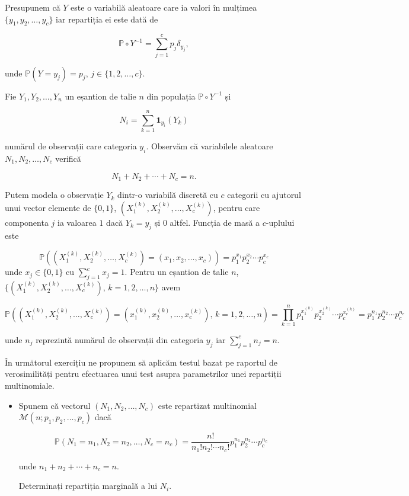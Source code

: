 \documentclass[]{article}
\newenvironment{frshaded*}{%
  \def\FrameCommand{\fboxrule=\FrameRule\fboxsep=\FrameSep \fcolorbox{framecolor}{shadecolor1}}%
  \MakeFramed {\advance\hsize-\width \FrameRestore}}%
{\endMakeFramed}
\newenvironment{rmdblock}[1]
  {\begin{frshaded*}
  \begin{itemize}
  \renewcommand{\labelitemi}{
    \raisebox{-.7\height}[0pt][0pt]{
      {\setkeys{Gin}{width=2em,keepaspectratio}\texttt{[image: images/icons/\#1]}}
    }
  }
  \item
  }
  {
  \end{itemize}
  \end{frshaded*}
  }
\newenvironment{rmdexercise}
  {\begin{rmdblock}{exercise}}
  {\end{rmdblock}}
\begin{document}
Presupunem că \(Y\) este o variabilă aleatoare care ia valori în
mulțimea \(\{y_1,y_2,\ldots,y_c\}\) iar repartiția ei este dată de

\[
\mathbb{P}\circ Y^{-1} = \sum_{j = 1}^{c}p_j\delta_{y_j},
\]

unde \(\mathbb{P}(Y = y_j) = p_{j},\, j\in\{1,2,\ldots,c\}\).

Fie \(Y_1, Y_2,\ldots, Y_n\) un eșantion de talie \(n\) din populația
\(\mathbb{P}\circ Y^{-1}\) și

\[
  N_i = \sum_{k = 1}^{n}\mathbf{1}_{y_i}(Y_k)
\]

numărul de observații care categoria \(y_i\). Observăm că variabilele
aleatoare \(N_1, N_2, \ldots, N_c\) verifică

\[
  N_1 + N_2 +\cdots+ N_c = n.
\]

Putem modela o observație \(Y_k\) dintr-o variabilă discretă cu \(c\)
categorii cu ajutorul unui vector elemente de \(\{0,1\}\),
\((X_1^{(k)}, X_2^{(k)}, \ldots, X_c^{(k)})\), pentru care componenta
\(j\) ia valoarea \(1\) dacă \(Y_k = y_j\) și \(0\) altfel. Funcția de
masă a \(c\)-uplului este

\[
\mathbb{P}((X_1^{(k)}, X_2^{(k)}, \ldots, X_c^{(k)}) = (x_1,x_2,\ldots,x_c)) = p_1^{x_1}p_2^{x_2}\cdots p_c^{x_c}
\] unde \(x_j\in\{0,1\}\) cu \(\sum_{j = 1}^{c}x_j = 1\). Pentru un
eșantion de talie \(n\),
\(\{(X_1^{(k)}, X_2^{(k)}, \ldots, X_c^{(k)}),\, k = 1,2,\ldots, n\}\)
avem

\[
\mathbb{P}\left((X_1^{(k)}, X_2^{(k)}, \ldots, X_c^{(k)}) = (x_1^{(k)},x_2^{(k)},\ldots,x_c^{(k)}), \,k = 1,2,\ldots,n\right) = \prod_{k=1}^{n}p_1^{x_1^{(k)}}p_2^{x_2^{(k)}}\cdots p_c^{x_c^{(k)}} = p_1^{n_1}p_2^{n_2}\cdots p_c^{n_c}
\]

unde \(n_j\) reprezintă numărul de observații din categoria \(y_j\) iar
\(\sum_{j = 1}^{c}n_j = n\).

În următorul exercițiu ne propunem să aplicăm testul bazat pe raportul
de verosimilități pentru efectuarea unui test asupra parametrilor unei
repartiții multinomiale.

\begin{rmdexercise}
Spunem că vectorul \((N_1, N_2,\ldots, N_c)\) este repartizat
multinomial \(\mathcal{M}(n;p_1,p_2,\ldots,p_c)\) dacă

\[
  \mathbb{P}(N_1 = n_1, N_2 = n_2, \ldots, N_c = n_c) = \frac{n!}{n_1!n_2!\cdots n_c!}p_1^{n_1}p_2^{n_2}\cdots p_c^{n_c}
\]

unde \(n_1 + n_2 +\cdots+n_c = n\).

Determinați repartiția marginală a lui \(N_i\).
\end{rmdexercise}
\end{document}
